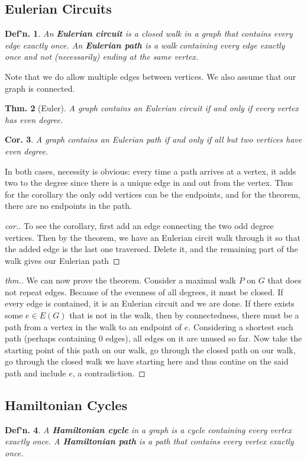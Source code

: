 \documentclass[12pt, a4paper]{book}
\newtheorem{theorem}{Thm.}[section]
\newtheorem{definition}[theorem]{Def'n.}
\newtheorem{corollary}[theorem]{Cor.}
\theoremstyle{nonumberplain}
\newtheorem{proof}{Proof}
\begin{document}
\subsection{Eulerian Circuits}
\begin{definition}
    An \textbf{Eulerian circuit} is a closed walk in a graph that contains every edge exactly once.
    An \textbf{Eulerian path} is a walk containing every edge exactly once and not (necessarily) ending at the same vertex.
\end{definition}
Note that we do allow multiple edges between vertices.
We also assume that our graph is connected.
\begin{theorem}[Euler]
    A graph contains an Eulerian circuit if and only if every vertex has even degree.
\end{theorem}
\begin{corollary}
    A graph contains an Eulerian path if and only if all but two vertices have even degree.
\end{corollary}
In both cases, necessity is obvious: every time a path arrives at a vertex, it adds two to the degree since there is a unique edge in and out from the vertex.
Thus for the corollary the only odd vertices can be the endpoints, and for the theorem, there are no endpoints in the path.
\begin{proof}[cor.]
    To see the corollary, first add an edge connecting the two odd degree vertices.
    Then by the theorem, we have an Eulerian circit walk through it so that the added edge is the last one traversed.
    Delete it, and the remaining part of the walk gives our Eulerian path
\end{proof}
\begin{proof}[thm.]
    We can now prove the theorem.
    Consider a maximal walk $P$ on $G$ that does not repeat edges.
    Because of the evenness of all degrees, it must be closed.
    If every edge is contained, it is an Eulerian circuit and we are done.
    If there exists some $e\in E(G)$ that is not in the walk, then by connectedness, there must be a path from a vertex in the walk to an endpoint of $e$.
    Considering a shortest such path (perhaps containing 0 edges), all edges on it are unused so far.
    Now take the starting point of this path on our walk, go through the closed path on our walk, go through the closed walk we have starting here and thus contine on the said path and include $e$, a contradiction.
\end{proof}
\subsection{Hamiltonian Cycles}
\begin{definition}
    A \textbf{Hamiltonian cycle} in a graph is a cycle containing every vertex exactly once.
    A \textbf{Hamiltonian path} is a path that contains every vertex exactly once.
\end{definition}
\end{document}
